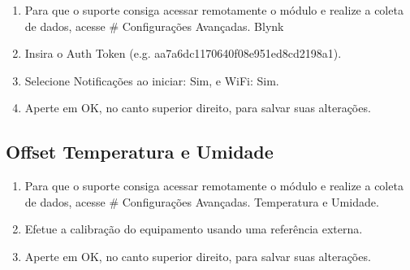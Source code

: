 \begin{enumerate}
    \item
    Para que o suporte consiga acessar remotamente o módulo e realize a coleta de dados, acesse \# \textrightarrow{} Configurações Avançadas.\textrightarrow{} Blynk

    \item
    Insira o Auth Token (e.g. aa7a6dc1170640f08e951ed8cd2198a1).

    \item
    Selecione Notificações ao iniciar: Sim, e WiFi: Sim.

    \item
    Aperte em OK, no canto superior direito, para salvar suas alterações.
\end{enumerate}

\subsection{Offset Temperatura e Umidade}

\begin{enumerate}
    \item
    Para que o suporte consiga acessar remotamente o módulo e realize a coleta de dados, acesse \# \textrightarrow{} Configurações Avançadas.\textrightarrow{} Temperatura e Umidade.

    \item
    Efetue a calibração do equipamento usando uma referência externa.

    \item
    Aperte em OK, no canto superior direito, para salvar suas alterações.
\end{enumerate}

